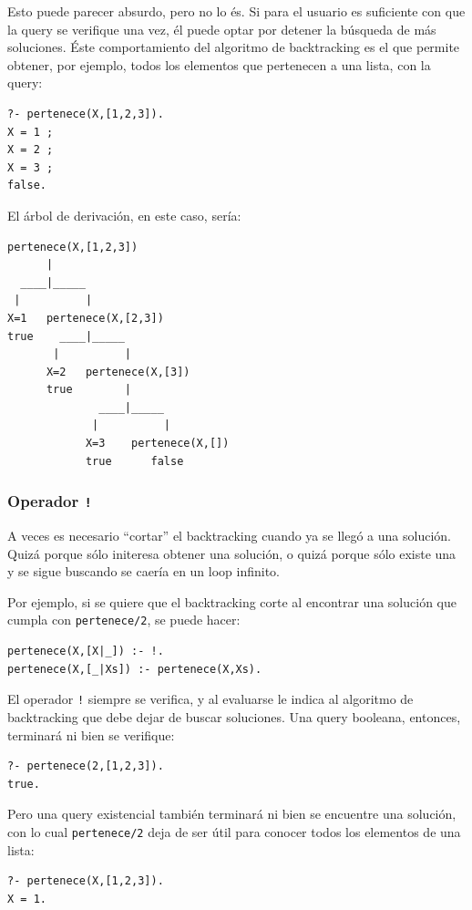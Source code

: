 \documentclass[12pt,titlepage]{article}
\begin{document}
Esto puede parecer absurdo, pero no lo és. Si para el usuario es suficiente con que la query se verifique una vez, él puede optar por detener la búsqueda de más soluciones. Éste comportamiento del algoritmo de backtracking es el que permite obtener, por ejemplo, todos los elementos que pertenecen a una lista, con la query:
\begin{lstlisting}
?- pertenece(X,[1,2,3]).
X = 1 ;
X = 2 ;
X = 3 ;
false.
\end{lstlisting}

El árbol de derivación, en este caso, sería:
\begin{Verbatim}[samepage=true,fontsize=\small]
pertenece(X,[1,2,3])
      |
  ____|_____      
 |          |
X=1   pertenece(X,[2,3])
true    ____|_____      
       |          |
      X=2   pertenece(X,[3])
      true        |
              ____|_____      
             |          |
            X=3    pertenece(X,[])
            true      false
\end{Verbatim}

\subsubsection{Operador \lstinline|!|}

A veces es necesario ``cortar'' el backtracking cuando ya se llegó a una solución. Quizá porque sólo initeresa obtener una solución, o quizá porque sólo existe una y se sigue buscando se caería en un loop infinito.

Por ejemplo, si se quiere que el backtracking corte al encontrar una solución que cumpla con \lstinline|pertenece/2|, se puede hacer:
\begin{lstlisting}
pertenece(X,[X|_]) :- !.
pertenece(X,[_|Xs]) :- pertenece(X,Xs).
\end{lstlisting}

El operador \lstinline|!| siempre se verifica, y al evaluarse le indica al algoritmo de backtracking que debe dejar de buscar soluciones. Una query booleana, entonces, terminará ni bien se verifique:
\begin{lstlisting}
?- pertenece(2,[1,2,3]).
true.
\end{lstlisting}

Pero una query existencial también terminará ni bien se encuentre una solución, con lo cual \lstinline|pertenece/2| deja de ser útil para conocer todos los elementos de una lista:
\begin{lstlisting}
?- pertenece(X,[1,2,3]).
X = 1.
\end{lstlisting}
\end{document}

